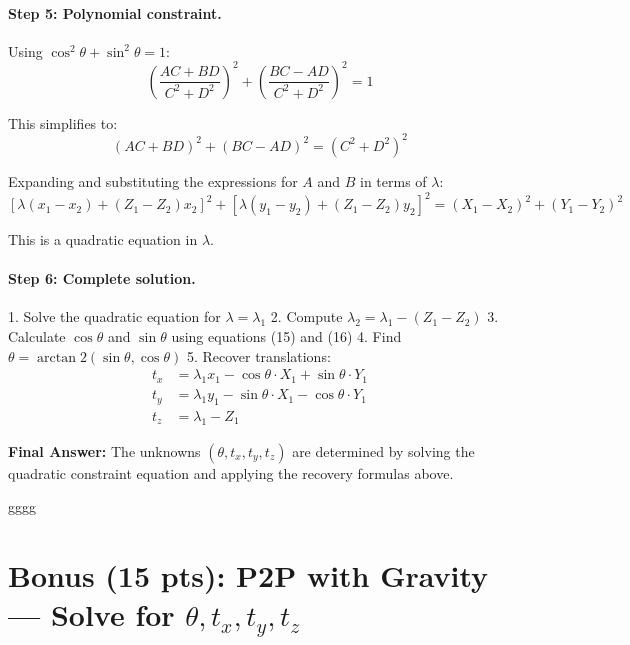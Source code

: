 \documentclass[12pt]{article}
\begin{document}
\paragraph{Step 5: Polynomial constraint.}
Using $\cos^2\theta + \sin^2\theta = 1$:
\[
\left(\frac{AC + BD}{C^2 + D^2}\right)^2 + \left(\frac{BC - AD}{C^2 + D^2}\right)^2 = 1
\]

This simplifies to:
\[
(AC + BD)^2 + (BC - AD)^2 = (C^2 + D^2)^2
\]

Expanding and substituting the expressions for $A$ and $B$ in terms of $\lambda$:
\[
\boxed{
\left[\lambda(x_1-x_2) + (Z_1-Z_2)x_2\right]^2 + \left[\lambda(y_1-y_2) + (Z_1-Z_2)y_2\right]^2 = (X_1-X_2)^2 + (Y_1-Y_2)^2
}
\]

This is a quadratic equation in $\lambda$.

\paragraph{Step 6: Complete solution.}
1. Solve the quadratic equation for $\lambda = \lambda_1$
2. Compute $\lambda_2 = \lambda_1 - (Z_1 - Z_2)$
3. Calculate $\cos\theta$ and $\sin\theta$ using equations (15) and (16)
4. Find $\theta = \arctan2(\sin\theta, \cos\theta)$
5. Recover translations:
   \begin{align}
   t_x &= \lambda_1 x_1 - \cos\theta \cdot X_1 + \sin\theta \cdot Y_1 \\
   t_y &= \lambda_1 y_1 - \sin\theta \cdot X_1 - \cos\theta \cdot Y_1 \\
   t_z &= \lambda_1 - Z_1
   \end{align}

\textbf{Final Answer:} The unknowns $(\theta, t_x, t_y, t_z)$ are determined by solving the quadratic constraint equation and applying the recovery formulas above.


gggg

\section*{Bonus (15 pts): P2P with Gravity — Solve for \(\theta,t_x,t_y,t_z\)}
\end{document}
